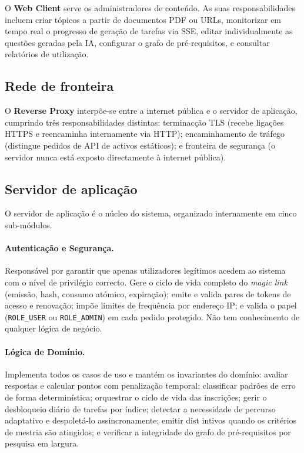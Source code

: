 O \textbf{Web Client} serve os administradores de conte\'udo. As suas
responsabilidades incluem criar t\'opicos a partir de documentos PDF ou URLs,
monitorizar em tempo real o progresso de gera\c{c}\~ao de tarefas via SSE,
editar individualmente as quest\~oes geradas pela IA, configurar o grafo de
pr\'e-requisitos, e consultar relat\'orios de utiliza\c{c}\~ao.

\subsection{Rede de fronteira}
\label{ssec:fronteira}

O \textbf{Reverse Proxy} interp\~oe-se entre a internet p\'ublica e o servidor
de aplica\c{c}\~ao, cumprindo tr\^es responsabilidades distintas: terminac\c{c}\~ao
TLS (recebe liga\c{c}\~oes HTTPS e reencaminha internamente via HTTP);
encaminhamento de tr\'afego (distingue pedidos de API de activos est\'aticos);
e fronteira de seguran\c{c}a (o servidor nunca est\'a exposto directamente
\`a internet p\'ublica).

\subsection{Servidor de aplica\c{c}\~ao}
\label{ssec:servidor}

O servidor de aplica\c{c}\~ao \'e o n\'ucleo do sistema, organizado
internamente em cinco sub-m\'odulos.

\paragraph{Autentica\c{c}\~ao e Seguran\c{c}a.}
Respons\'avel por garantir que apenas utilizadores leg\'itimos acedem ao
sistema com o n\'ivel de privil\'egio correcto. Gere o ciclo de vida completo
do \emph{magic link} (emiss\~ao, hash, consumo at\'omico, expira\c{c}\~ao);
emite e valida pares de tokens de acesso e renova\c{c}\~ao; imp\~oe limites
de frequ\^encia por endere\c{c}o IP; e valida o papel
(\texttt{ROLE\_USER} ou \texttt{ROLE\_ADMIN}) em cada pedido protegido.
N\~ao tem conhecimento de qualquer l\'ogica de neg\'ocio.

\paragraph{L\'ogica de Dom\'inio.}
Implementa todos os casos de uso e mant\'em os invariantes do dom\'inio:
avaliar respostas e calcular pontos com penaliza\c{c}\~ao temporal; classificar
padr\~oes de erro de forma determin\'istica; orquestrar o ciclo de vida das
inscri\c{c}\~oes; gerir o desbloqueio di\'ario de tarefas por \'indice; detectar
a necessidade de percurso adaptativo e despolet\'a-lo assincronamente; emitir
dist intivos quando os crit\'erios de mestria s\~ao atingidos; e verificar a
integridade do grafo de pr\'e-requisitos por pesquisa em largura.

